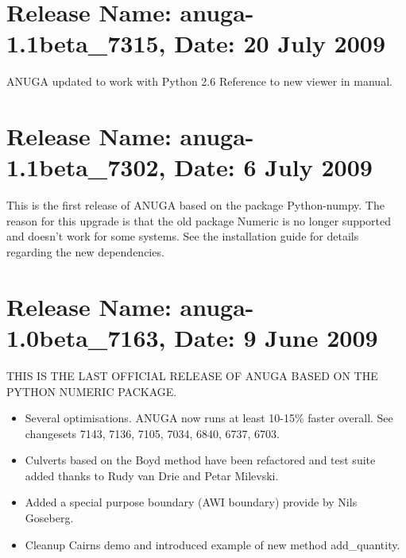 \documentclass{manual}
\begin{document}
\section{Release Name: anuga-1.1beta\_7315, Date: 20 July 2009}

ANUGA updated to work with Python 2.6
Reference to new viewer in manual.



\section{Release Name: anuga-1.1beta\_7302, Date: 6 July 2009}
This is the first release of ANUGA based on the package Python-numpy.
The reason for this upgrade is that the old package Numeric is 
no longer supported and doesn't work for some systems.
See the installation guide for details regarding the new dependencies.


\section{Release Name: anuga-1.0beta\_7163, Date: 9 June 2009}

THIS IS THE LAST OFFICIAL RELEASE OF ANUGA BASED ON THE PYTHON NUMERIC PACKAGE.

\begin{itemize}
  \item Several optimisations. ANUGA now runs at least 10-15\% faster overall. See changesets 7143, 7136, 7105, 7034, 6840, 6737, 6703.
  \item Culverts based on the Boyd method have been refactored and test suite added thanks to Rudy van Drie and Petar Milevski.
  \item Added a special purpose boundary (AWI boundary) provide by Nils Goseberg.
  \item Cleanup Cairns demo and introduced example of new method add\_quantity.
\end{itemize}
\end{document}
